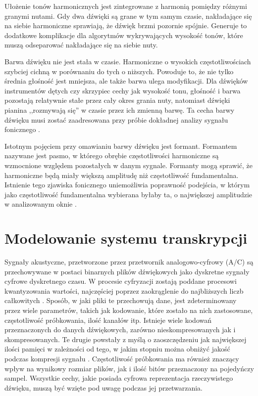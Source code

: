 \documentclass[12pt,a4paper,twoside]{mwart}
\begin{document}
Ułożenie tonów harmonicznych jest zintegrowane z harmonią pomiędzy różnymi granymi nutami. Gdy dwa dźwięki są grane w tym samym czasie, nakładające się na siebie harmoniczne sprawiają, że dźwięk brzmi pozornie spójnie. Generuje to dodatkowe komplikacje dla algorytmów wykrywających wysokość tonów, które muszą odseparować nakładające się na siebie nuty.

Barwa dźwięku nie jest stała w czasie. Harmoniczne o wysokich częstotliwościach szybciej cichną w porównaniu do tych o niższych. Powoduje to, że nie tylko średnia głośność jest mniejsza, ale także barwa ulega modyfikacji. Dla dźwięków instrumentów dętych czy skrzypiec cechy jak wysokość tonu, głośność i barwa pozostają relatywnie stałe przez cały okres grania nuty, natomiast dźwięki pianina ,,rozmywają się'' w czasie przez ich zmienną barwę. Ta cecha barwy dźwięku musi zostać zaadresowana przy próbie dokładnej analizy sygnału fonicznego 
\cite[64-65]{Homerecording:DlaKazdego}
\cite[804–805]{Transcription:Klapuri:MultipleFundamentalFrequencyEstimation}.


Istotnym pojęciem przy omawianiu barwy dźwięku jest formant. Formantem nazywane jest pasmo, w którego obrębie częstotliwości harmoniczne są wzmocnione względem pozostałych w danym sygnale. Formanty mogą sprawić, że harmoniczne będą miały większą amplitudę niż częstotliwość fundamentalna. Istnienie tego zjawiska fonicznego uniemożliwia poprawność podejścia, w którym jako częstotliwość fundamentalna wybierana byłaby ta, o największej amplitudzie w analizowanym oknie 
\cite[24-25]{Transcription:Klapuri:Phd}.

\newpage
\section{Modelowanie systemu transkrypcji} \label{sec:modelowanieSystemu}
Sygnały akustyczne, przetworzone przez przetwornik analogowo-cyfrowy (A/C) są przechowywane w postaci binarnych plików dźwiękowych jako dyskretne sygnały cyfrowe dyskretnego czasu. W procesie cyfryzacji zostają poddane procesowi kwantyzowania wartości, najczęściej poprzez zaokrąglenie do najbliższych liczb całkowitych 
\cite[1-4]{CyfrowePrzetwarzanieSygnalowOdTeoriiDoZastosowan}.
Sposób, w jaki pliki te przechowują dane, jest zdeterminowany przez wiele parametrów, takich jak kodowanie, które zostało na nich zastosowane, częstotliwość próbkowania, ilość kanałów itp. Istnieje wiele kodowań przeznaczonych do danych dźwiękowych, zarówno nieskompresowanych jak i skompresowanych. Te drugie powstały z myślą o zaoszczędzeniu jak największej ilości pamięci w zależności od tego, w jakim stopniu można obniżyć jakość podczas kompresji sygnału 
\cite[66]{Homerecording:DlaKazdego}.
Częstotliwość próbkowania ma również znaczący wpływ na wynikowy rozmiar plików, jak i ilość bitów przeznaczony na pojedyńczy sampel. Wszystkie cechy, jakie posiada cyfrowa reprezentacja rzeczywistego dźwięku, muszą być wzięte pod uwagę podczas jej przetwarzania.
\end{document}
